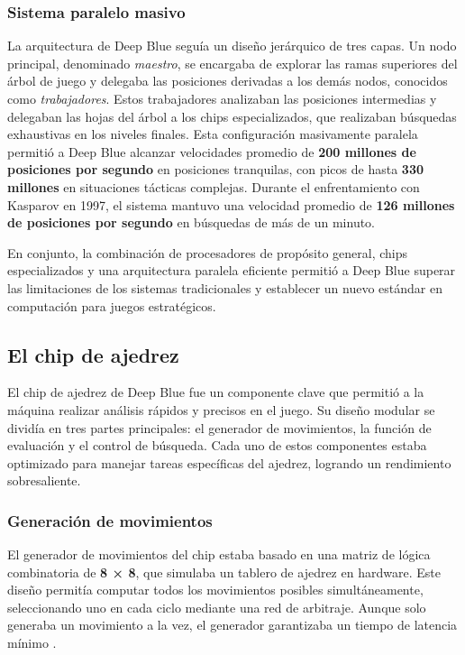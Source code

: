 \documentclass[12pt,a4paper]{article}
\begin{document}
\subsubsection*{Sistema paralelo masivo}
La arquitectura de Deep Blue seguía un diseño jerárquico de tres capas. Un nodo principal, denominado \textit{maestro}, se encargaba de explorar las ramas superiores del árbol de juego y delegaba las posiciones derivadas a los demás nodos, conocidos como \textit{trabajadores}. Estos trabajadores analizaban las posiciones intermedias y delegaban las hojas del árbol a los chips especializados, que realizaban búsquedas exhaustivas en los niveles finales. Esta configuración masivamente paralela permitió a Deep Blue alcanzar velocidades promedio de \textbf{200 millones de posiciones por segundo} en posiciones tranquilas, con picos de hasta \textbf{330 millones} en situaciones tácticas complejas. Durante el enfrentamiento con Kasparov en 1997, el sistema mantuvo una velocidad promedio de \textbf{126 millones de posiciones por segundo} en búsquedas de más de un minuto.

En conjunto, la combinación de procesadores de propósito general, chips especializados y una arquitectura paralela eficiente permitió a Deep Blue superar las limitaciones de los sistemas tradicionales y establecer un nuevo estándar en computación para juegos estratégicos.

\subsection{El chip de ajedrez}

El chip de ajedrez de Deep Blue fue un componente clave que permitió a la máquina realizar análisis rápidos y precisos en el juego. Su diseño modular se dividía en tres partes principales: el generador de movimientos, la función de evaluación y el control de búsqueda. Cada uno de estos componentes estaba optimizado para manejar tareas específicas del ajedrez, logrando un rendimiento sobresaliente.

\subsubsection*{Generación de movimientos}
El generador de movimientos del chip estaba basado en una matriz de lógica combinatoria de \textbf{8 × 8}, que simulaba un tablero de ajedrez en hardware. Este diseño permitía computar todos los movimientos posibles simultáneamente, seleccionando uno en cada ciclo mediante una red de arbitraje. Aunque solo generaba un movimiento a la vez, el generador garantizaba un tiempo de latencia mínimo \cite{campbell2002deepblue}. 
\end{document}
